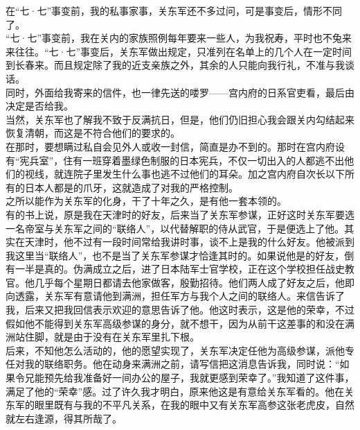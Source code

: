 在“七·七”事变前，我的私事家事，关东军还不多过问，可是事变后，情形不同了。\\

“七·七”事变前，我在关内的家族照例每年要来一些人，为我祝寿，平时也不兔来来往往。“七·七”事变后，关东军做出规定，只准列在名单上的几个人在一定时间到长春来。而且规定除了我的近支亲族之外，其余的人只能向我行礼，不准与我谈话。\\

同时，外面给我寄来的信件，也一律先送的喽罗——宫内府的日系官吏看，最后由决定是否给我。\\

当然，关东军也了解我不致于反满抗日，但是，他们仍旧担心我会跟关内勾结起来恢复清朝，而这是不符合他们的要求的。\\

在那时，要想瞒过私自会见外人或收一封信，简直是办不到的。那时在宫内府设有“宪兵室”，住有一班穿着墨绿色制服的日本宪兵，不仅一切出入的人都逃不出他们的视线，就连院子里发生什么事也逃不过他们的耳朵。加之宫内府自次长以下所有的日本人都是的爪牙，这就造成了对我的严格控制。\\

之所以能作为关东军的化身，干了十年之久，是有他一套本领的。\\

有的书上说，原是我在天津时的好友，后来当了关东军参谋，正好这时关东军要选一名帝室与关东军之间的“联络人”，以代替解职的侍从武官，于是便选上了他。其实在天津时，他不过有一段时间常给我讲时事，谈不上是我的什么好友。他被派到我这里当“联络人”，也不是当了关东军参谋才恰逢其时的。如果说他是的好友，倒有一半是真的。伪满成立之后，进了日本陆军士官学校，正在这个学校担任战史教官。他几乎每个星期日都请去他家做客，殷勤招待。他们两人成了好友之后，他即向透露，关东军有意请他到满洲，担任军方与我个人之间的联络人。来信告诉了我，后来又把我回信表示欢迎的意思告诉了他。他这时表示，这是他的荣幸，不过假如他不能得到关东军高级参谋的身分，就不想干，因为从前干这差事的和没在满洲站住脚，就是由于没有在关东军里扎下根。\\

后来，不知他怎么活动的，他的愿望实现了，关东军决定任他为高级参谋，派他专任对我的联络职务。他在动身来满洲之前，请写信把这消息告诉我，同时说：“如果令兄能预先给我准备好一间办公的屋子，我就更感到荣幸了。”我知道了这件事，满足了他的“荣幸”感。过了许久我才明白，原来他这是有意给关东军看的。他在关东军的眼里既有与我的不平凡关系，在我的眼中又有关东军高参这张老虎皮，自然就左右逢源，得其所哉了。\\

